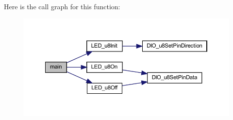 Here is the call graph for this function\+:
\nopagebreak
\begin{figure}[H]
\begin{center}
\leavevmode
\includegraphics[width=350pt]{main_8c_ae66f6b31b5ad750f1fe042a706a4e3d4_cgraph}
\end{center}
\end{figure}

